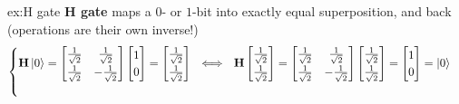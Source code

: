 \documentclass{easyclass}
\begin{document}
\begin{example}{ex:H gate}
	\textbf{H gate} maps a $0$- or $1$-bit into exactly equal superposition, and back (operations are their own inverse!)
	\begin{equation}
		\begin{cases}
			\mathbf{H}\ket{0}=
			\begin{bmatrix}
				\frac{1}{\sqrt{2}} & \frac{1}{\sqrt{2}}\\
				\frac{1}{\sqrt{2}} & -\frac{1}{\sqrt{2}}
			\end{bmatrix} 
			\begin{bmatrix}
				1 \\ 0
			\end{bmatrix}=
			\begin{bmatrix}
				\frac{1}{\sqrt{2}} \\ \frac{1}{\sqrt{2}}
			\end{bmatrix}
			\ \,\,\Longleftrightarrow
			\ \,\,\mathbf{H}\begin{bmatrix}
				\frac{1}{\sqrt{2}} \\ \frac{1}{\sqrt{2}}
			\end{bmatrix}=
			\begin{bmatrix}
				\frac{1}{\sqrt{2}} & \frac{1}{\sqrt{2}}\\
				\frac{1}{\sqrt{2}} & -\frac{1}{\sqrt{2}}
			\end{bmatrix} 
			\begin{bmatrix}
				\frac{1}{\sqrt{2}} \\ \frac{1}{\sqrt{2}}
			\end{bmatrix}=
			\begin{bmatrix}
				1 \\ 0
			\end{bmatrix}=\ket{0}
			\\\\
			

\end{cases}
\end{equation}
\end{example}
\end{document}
